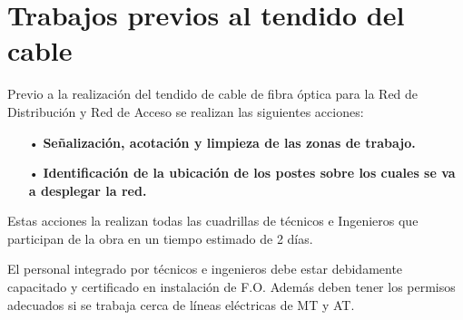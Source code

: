 \section{Trabajos previos al tendido del cable}
Previo a la realización del tendido de cable de fibra óptica para la Red de Distribución y Red de Acceso se realizan las siguientes acciones:
\begin{itemize}
\item[•]\textbf{Señalización, acotación  y limpieza de las zonas de trabajo.}


\item[•]\textbf{Identificación de la ubicación de los postes sobre los cuales se va a desplegar la red.}

 
\end{itemize}
Estas acciones la realizan todas las cuadrillas de técnicos e Ingenieros que participan de la obra en un tiempo estimado de 2 días. 

El personal integrado por técnicos e ingenieros debe estar debidamente capacitado y certificado en instalación de F.O. Además deben tener los permisos adecuados si se trabaja cerca de líneas eléctricas de MT y AT.

